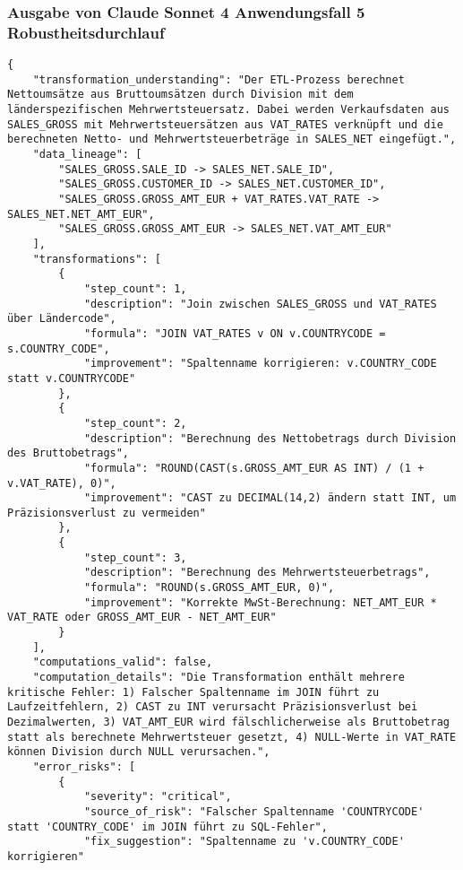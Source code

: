\subsubsection{Ausgabe von Claude Sonnet 4 Anwendungsfall 5 Robustheitsdurchlauf}\label{anhang:subsubsec:claude_case5_prompt3}
\begin{lstlisting}[caption={Ausgabe: Claude Sonnet 4 Anwendungsfall 5 Robustheitsdurchlauf},label={claude_case5_prompt3}]
{
    "transformation_understanding": "Der ETL-Prozess berechnet Nettoumsätze aus Bruttoumsätzen durch Division mit dem länderspezifischen Mehrwertsteuersatz. Dabei werden Verkaufsdaten aus SALES_GROSS mit Mehrwertsteuersätzen aus VAT_RATES verknüpft und die berechneten Netto- und Mehrwertsteuerbeträge in SALES_NET eingefügt.",
    "data_lineage": [
        "SALES_GROSS.SALE_ID -> SALES_NET.SALE_ID",
        "SALES_GROSS.CUSTOMER_ID -> SALES_NET.CUSTOMER_ID",
        "SALES_GROSS.GROSS_AMT_EUR + VAT_RATES.VAT_RATE -> SALES_NET.NET_AMT_EUR",
        "SALES_GROSS.GROSS_AMT_EUR -> SALES_NET.VAT_AMT_EUR"
    ],
    "transformations": [
        {
            "step_count": 1,
            "description": "Join zwischen SALES_GROSS und VAT_RATES über Ländercode",
            "formula": "JOIN VAT_RATES v ON v.COUNTRYCODE = s.COUNTRY_CODE",
            "improvement": "Spaltenname korrigieren: v.COUNTRY_CODE statt v.COUNTRYCODE"
        },
        {
            "step_count": 2,
            "description": "Berechnung des Nettobetrags durch Division des Bruttobetrags",
            "formula": "ROUND(CAST(s.GROSS_AMT_EUR AS INT) / (1 + v.VAT_RATE), 0)",
            "improvement": "CAST zu DECIMAL(14,2) ändern statt INT, um Präzisionsverlust zu vermeiden"
        },
        {
            "step_count": 3,
            "description": "Berechnung des Mehrwertsteuerbetrags",
            "formula": "ROUND(s.GROSS_AMT_EUR, 0)",
            "improvement": "Korrekte MwSt-Berechnung: NET_AMT_EUR * VAT_RATE oder GROSS_AMT_EUR - NET_AMT_EUR"
        }
    ],
    "computations_valid": false,
    "computation_details": "Die Transformation enthält mehrere kritische Fehler: 1) Falscher Spaltenname im JOIN führt zu Laufzeitfehlern, 2) CAST zu INT verursacht Präzisionsverlust bei Dezimalwerten, 3) VAT_AMT_EUR wird fälschlicherweise als Bruttobetrag statt als berechnete Mehrwertsteuer gesetzt, 4) NULL-Werte in VAT_RATE können Division durch NULL verursachen.",
    "error_risks": [
        {
            "severity": "critical",
            "source_of_risk": "Falscher Spaltenname 'COUNTRYCODE' statt 'COUNTRY_CODE' im JOIN führt zu SQL-Fehler",
            "fix_suggestion": "Spaltenname zu 'v.COUNTRY_CODE' korrigieren"

\end{lstlisting}
